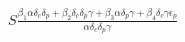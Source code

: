 \documentclass[preview]{standalone}
\begin{document}
\begin{center}
$S \frac{\beta_1 \alpha \delta_c \delta_p + \beta_2 \delta_c \delta_p \gamma + \beta_3 \alpha \delta_p \gamma + \beta_4 \delta_c \gamma \epsilon_p}{\alpha \delta_c \delta_p \gamma}$
\end{center}
\end{document}
